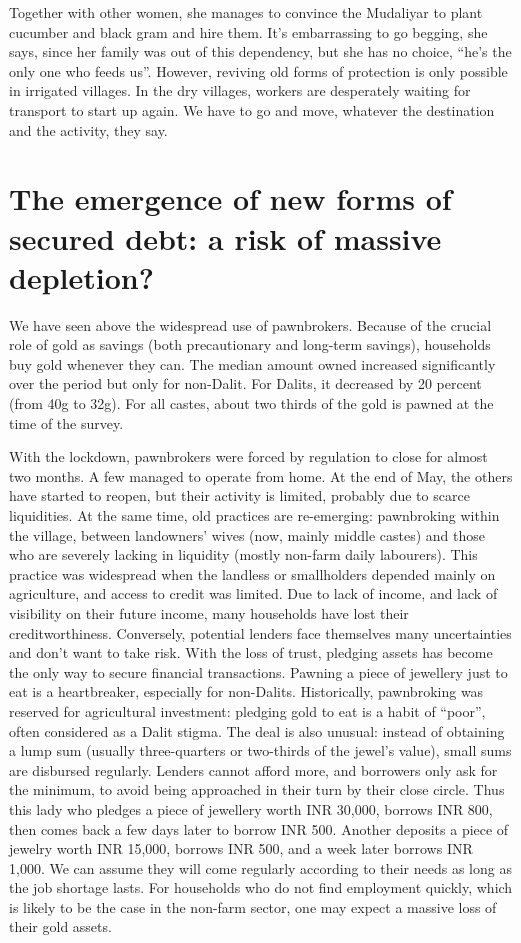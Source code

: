 \documentclass[a4paper, 11pt, onecolumn]{article}
\begin{document}
Together with other women, she manages to convince the Mudaliyar to plant cucumber and black gram and hire them. It's embarrassing to go begging, she says, since her family was out of this dependency, but she has no choice, ``he's the only one who feeds us''.   However, reviving old forms of protection is only possible in irrigated villages. In the dry villages, workers are desperately waiting for transport to start up again. We have to go and move, whatever the destination and the activity, they say.  

\section{The emergence of new forms of secured debt: a risk of massive depletion?}
\label{section:newforms}

We have seen above the widespread use of pawnbrokers. Because of the crucial role of gold as savings (both precautionary and long-term savings), households buy gold whenever they can. The median amount owned increased significantly over the period but only for non-Dalit. For Dalits, it decreased by 20 percent (from 40g to 32g).  For all castes, about two thirds of the gold is pawned at the time of the survey. 

With the lockdown, pawnbrokers were forced by regulation to close for almost two months. A few managed to operate from home. At the end of May, the others have started to reopen, but their activity is limited, probably due to scarce liquidities. At the same time, old practices are re-emerging: pawnbroking within the village, between landowners' wives (now, mainly middle castes) and those who are severely lacking in liquidity (mostly non-farm daily labourers). This practice was widespread when the landless or smallholders depended mainly on agriculture, and access to credit was limited. Due to lack of income, and lack of visibility on their future income, many households have lost their creditworthiness. Conversely, potential lenders face themselves many uncertainties and don’t want to take risk.  With the loss of trust, pledging assets has become the only way to secure financial transactions. Pawning a piece of jewellery just to eat is a heartbreaker, especially for non-Dalits. Historically, pawnbroking was reserved for agricultural investment: pledging gold to eat is a habit of ``poor'', often considered as a Dalit stigma. The deal is also unusual: instead of obtaining a lump sum (usually three-quarters or two-thirds of the jewel’s value), small sums are disbursed regularly. Lenders cannot afford more, and borrowers only ask for the minimum, to avoid being approached in their turn by their close circle. Thus this lady who pledges a piece of jewellery worth INR 30,000, borrows INR 800, then comes back a few days later to borrow INR 500. Another deposits a piece of jewelry worth INR 15,000, borrows INR 500, and a week later borrows INR 1,000. We can assume they will come regularly according to their needs as long as the job shortage lasts.  For households who do not find employment quickly, which is likely to be the case in the non-farm sector, one may expect a massive loss of their gold assets. 
\end{document}
